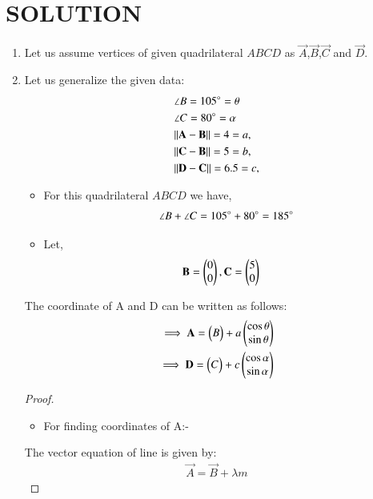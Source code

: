 \documentclass[journal,12pt,twocolumn]{IEEEtran}
\begin{document}
\section{SOLUTION}
\begin{enumerate}
\item Let us assume vertices of given quadrilateral $ABCD$ as $\vec{A}$,$\vec{B}$,$\vec{C}$ and $\vec{D}$.
\item Let us generalize the given data:
    \begin{align}
    &\angle B= 105\degree=\theta \label{eq1}
    \\
    &\angle C= 80\degree=\alpha \label{eq2}
    \\
    &\Vert\mathbf{A}-\mathbf{B}\rVert =4=a, \label{eq3}
    \\
    &\Vert\mathbf{C}-\mathbf{B}\rVert =5=b,\label{eq4}
    \\
     &\Vert\mathbf{D}-\mathbf{C}\rVert =6.5=c,\label{eq5}
    \end{align}
\begin{itemize}
\item For this quadrilateral $ABCD$ we have,
\begin{align}
\angle B +\angle C = 105\degree + 80\degree =185\degree
\end{align}
\item Let, \begin{align}
    &\mathbf{B}=\begin{pmatrix}0\\0\end{pmatrix}, \mathbf{C}=\begin{pmatrix}5\\0\end{pmatrix} \label{eq6}
\end{align}
\end{itemize}
\begin{lemma}
\label{lemma}
The coordinate of A and D can be written as follows:
\begin{align}
\implies \mathbf{A}=\begin{pmatrix}B\end{pmatrix} + a\begin{pmatrix}\cos\theta \\\sin \theta \end{pmatrix}
\\
\implies \mathbf{D}=\begin{pmatrix}C\end{pmatrix} + c\begin{pmatrix}\cos \alpha\\\sin \alpha \end{pmatrix}
\end{align}
\end{lemma}
\begin{proof}
\begin{itemize}
\item For finding coordinates of A:-
\end{itemize}
The vector equation of line is given by:
\begin{align}
\vec{A}=\vec{B} + \lambda m \label{eq7}
\end{align}

\end{proof}
\end{enumerate}
\end{document}
